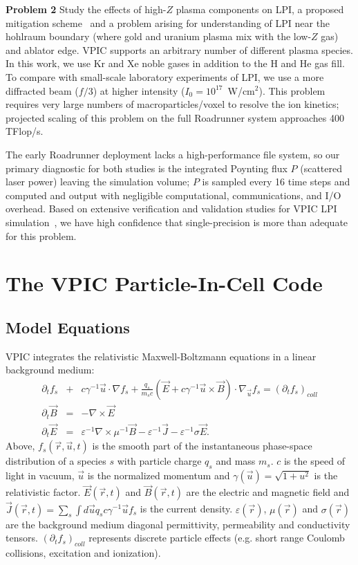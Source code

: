 \documentclass[10pt]{article}
\newcommand{\eps}{\varepsilon}
\newcommand{\vecr}{\vec{r}}
\newcommand{\vecu}{\vec{u}}
\newcommand{\vecJ}{\vec{J}}
\newcommand{\vecE}{\vec{E}}
\newcommand{\vecB}{\vec{B}}
\newcommand{\PDeriv}[2]{\partial_{#2}#1}
\newcommand{\DotP}[2]{#1 \cdot #2}
\newcommand{\CrossP}[2]{#1 \times #2}
\newcommand{\Grad}[1]{\nabla #1}
\newcommand{\Curl}[1]{\nabla \times #1}
\newcommand{\Gradu}[1]{\nabla_{\vecu} #1}
\begin{document}
\textbf{Problem 2}
Study the effects of high-$Z$ plasma components on LPI, a proposed mitigation 
scheme~\cite{Lushnikov_PPCF_2006} and a problem arising
for understanding of LPI near the hohlraum boundary (where gold and
uranium plasma mix with the low-$Z$ gas) and ablator edge.  VPIC
supports an arbitrary number of different plasma species.  In this 
work, we use Kr and Xe noble gases in addition to the H
and He gas fill.  To compare with small-scale laboratory experiments
of LPI, we use a more diffracted beam ($f/3$) at higher intensity
($I_0 = 10^{17}$~W/cm$^2$). This problem requires very large numbers
of macroparticles/voxel to resolve the ion kinetics; projected scaling
of this problem on the full Roadrunner system approaches 400 TFlop/s.

The early Roadrunner deployment lacks a high-performance file system,
so our primary diagnostic for both studies is the integrated Poynting
flux $P$ (scattered laser power) leaving the simulation volume; $P$ is
sampled every 16 time steps and computed and output with
negligible computational, communications, and I/O overhead.  Based on extensive
verification and validation studies for VPIC LPI 
simulation~\cite{Yin_et_al_Phys_Plasmas_2006}, 
we have high confidence that single-precision is more than adequate 
for this problem.


\section{The VPIC Particle-In-Cell Code}

\subsection{Model Equations}

VPIC integrates the relativistic Maxwell-Boltzmann equations in a
linear background medium:
\begin{eqnarray}
\PDeriv{f_s}{t} &+& 
\DotP{c\gamma^{-1}\vecu}{\Grad{f_s}} +
\DotP{\frac{q_s}{m_s c}\left(\vecE+\CrossP{c\gamma^{-1}\vecu}{\vecB}\right)}
{\Gradu{f_s}} = \left(\PDeriv{f_s}{t}\right)_{coll} \label{eq:Boltzmann}\\
\PDeriv{\vecB}{t} &=& -\Curl{\vecE} \label{eq:Faraday}\\
\PDeriv{\vecE}{t} &=&
\eps^{-1}\Curl{\mu^{-1}\vecB} - \eps^{-1}\vecJ - \eps^{-1}\sigma\vecE
\label{eq:Ampere}
.
\end{eqnarray}
Above, $f_s\left(\vecr,\vecu,t\right)$ is the smooth part of the
instantaneous phase-space distribution of a species $s$ with particle
charge $q_s$ and mass $m_s$.  $c$ is the speed of light in vacuum,
$\vecu$ is the normalized momentum and $\gamma\left(\vecu\right) =
\sqrt{1 + u^2}$ is the relativistic factor.
$\vecE\left(\vecr,t\right)$ and $\vecB\left(\vecr,t\right)$ are the
electric and magnetic field and $\vecJ\left(\vecr,t\right) =
\sum_s \int d\vecu q_s c\gamma^{-1}\vecu f_s$ is the current
density.  $\eps\left(\vecr\right)$, $\mu\left(\vecr\right)$ and
$\sigma\left(\vecr\right)$ are the background medium diagonal
permittivity, permeability and conductivity tensors.
$\left(\PDeriv{f_s}{t}\right)_{coll}$ represents discrete
particle effects (e.g. short range Coulomb collisions, excitation and
ionization).
\end{document}
